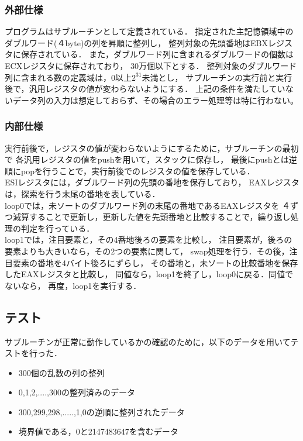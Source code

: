 \documentclass[a4j]{jarticle}
\begin{document}
\subsubsection{外部仕様}
プログラムはサブルーチンとして定義されている．
指定された主記憶領域中のダブルワード(４byte)の列を昇順に整列し，
整列対象の先頭番地はEBXレジスタに保存されている．
また，ダブルワード列に含まれるダブルワードの個数はECXレジスタに保存されており，
30万個以下とする．
整列対象のダブルワード列に含まれる数の定義域は，0以上$2^{31}$未満とし，
サブルーチンの実行前と実行後で，汎用レジスタの値が変わらないようにする．
上記の条件を満たしていないデータ列の入力は想定しておらず、その場合のエラー処理等は特に行わない。

\subsubsection{内部仕様}
実行前後で，レジスタの値が変わらないようにするために，サブルーチンの最初で
各汎用レジスタの値をpushを用いて，スタックに保存し，
最後にpushとは逆順にpopを行うことで，実行前後でのレジスタの値を保存している．\\
\indent ESIレジスタには，ダブルワード列の先頭の番地を保存しており，
EAXレジスタは，探索を行う末尾の番地を表している．\\
\indent loop0では，未ソートのダブルワード列の末尾の番地であるEAXレジスタを
４ずつ減算することで更新し，更新した値を先頭番地と比較することで，繰り返し処理の判定を行っている．\\
\indent loop1では，注目要素と，その4番地後ろの要素を比較し，
注目要素が，後ろの要素よりも大きいなら，その2つの要素に関して，
swap処理を行う．その後，注目要素の番地を4バイト後ろにずらし，
その番地と，未ソートの比較番地を保存したEAXレジスタと比較し，
同値なら，loop1を終了し，loop0に戻る．同値でないなら，
再度，loop1を実行する．

\subsection{テスト}
サブルーチンが正常に動作しているかの確認のために，以下のデータを用いてテストを行った．
\begin{itemize}
\item 300個の乱数の列の整列
\item 0,1,2,....,300の整列済みのデータ
\item 300,299,298,.....,1,0の逆順に整列されたデータ
\item 境界値である，0と2147483647を含むデータ
\end{itemize}
\end{document}
